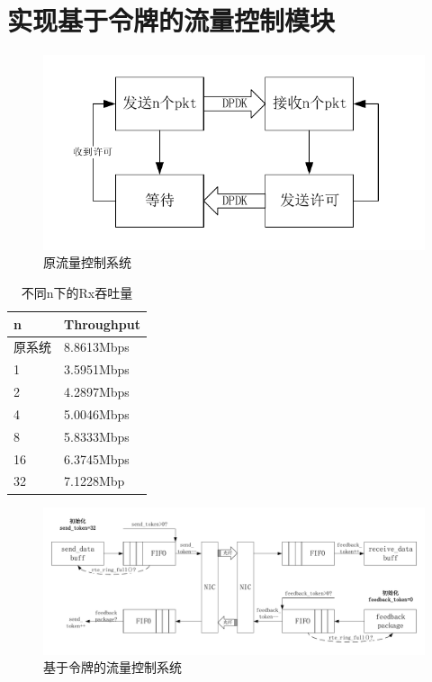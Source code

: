 \documentclass{article}
\begin{document}
\section{实现基于令牌的流量控制模块}
\begin{figure}[H]
	\centering
	\includegraphics[width = .6\textwidth]{flow_traffic.pdf}
	\caption{原流量控制系统}
\end{figure}
\begin{table}[H]
	\caption{不同n下的Rx吞吐量}
	\centering
	\begin{tabular}{|l|l|}%
		\hline  %
		n		& Throughput	\\
		\hline
		原系统	& 8.8613Mbps	\\
		\hline
		1		& 3.5951Mbps	\\
		\hline
		2		& 4.2897Mbps	\\
		\hline
		4   	& 5.0046Mbps	\\
		\hline
		8		& 5.8333Mbps	\\
		\hline
		16		& 6.3745Mbps	\\
		\hline
		32		& 7.1228Mbp		\\
		\hline
	\end{tabular}
\end{table}
\begin{figure}[H]
	\centering
	\includegraphics[width = \textwidth]{frame_token.pdf}
	\caption{基于令牌的流量控制系统}
\end{figure}

\newpage
\end{document}
